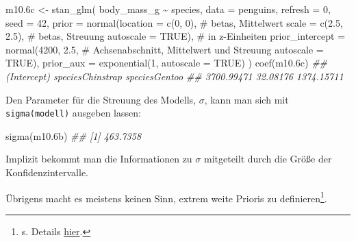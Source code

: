 \documentclass[
  a4paper,
  DIV=11]{scrreprt}
\newenvironment{Shaded}{\begin{snugshade}}{\end{snugshade}}
\newcommand{\AttributeTok}[1]{\textcolor[rgb]{0.40,0.45,0.13}{#1}}
\newcommand{\CommentTok}[1]{\textcolor[rgb]{0.37,0.37,0.37}{#1}}
\newcommand{\ConstantTok}[1]{\textcolor[rgb]{0.56,0.35,0.01}{#1}}
\newcommand{\DecValTok}[1]{\textcolor[rgb]{0.68,0.00,0.00}{#1}}
\newcommand{\DocumentationTok}[1]{\textcolor[rgb]{0.37,0.37,0.37}{\textit{#1}}}
\newcommand{\FloatTok}[1]{\textcolor[rgb]{0.68,0.00,0.00}{#1}}
\newcommand{\FunctionTok}[1]{\textcolor[rgb]{0.28,0.35,0.67}{#1}}
\newcommand{\NormalTok}[1]{\textcolor[rgb]{0.00,0.23,0.31}{#1}}
\newcommand{\OtherTok}[1]{\textcolor[rgb]{0.00,0.23,0.31}{#1}}
\newcommand{\SpecialCharTok}[1]{\textcolor[rgb]{0.37,0.37,0.37}{#1}}
\theoremstyle{definition}
\theoremstyle{remark}
\begin{document}
\begin{Shaded}
\begin{Highlighting}[]
\NormalTok{m10}\FloatTok{.6}\NormalTok{c }\OtherTok{\textless{}{-}} \FunctionTok{stan\_glm}\NormalTok{(}
\NormalTok{  body\_mass\_g }\SpecialCharTok{\textasciitilde{}}\NormalTok{ species, }
  \AttributeTok{data =}\NormalTok{ penguins, }
  \AttributeTok{refresh =} \DecValTok{0}\NormalTok{,}
  \AttributeTok{seed =} \DecValTok{42}\NormalTok{,}
  \AttributeTok{prior =} \FunctionTok{normal}\NormalTok{(}\AttributeTok{location =} \FunctionTok{c}\NormalTok{(}\DecValTok{0}\NormalTok{, }\DecValTok{0}\NormalTok{),  }\CommentTok{\# betas, Mittelwert}
                 \AttributeTok{scale =} \FunctionTok{c}\NormalTok{(}\FloatTok{2.5}\NormalTok{, }\FloatTok{2.5}\NormalTok{),  }\CommentTok{\# betas, Streuung}
                 \AttributeTok{autoscale =} \ConstantTok{TRUE}\NormalTok{),  }\CommentTok{\# in z{-}Einheiten}
  \AttributeTok{prior\_intercept =} \FunctionTok{normal}\NormalTok{(}\DecValTok{4200}\NormalTok{, }\FloatTok{2.5}\NormalTok{,   }\CommentTok{\# Achsenabschnitt, Mittelwert und Streuung}
                           \AttributeTok{autoscale =} \ConstantTok{TRUE}\NormalTok{), }
  \AttributeTok{prior\_aux =} \FunctionTok{exponential}\NormalTok{(}\DecValTok{1}\NormalTok{, }\AttributeTok{autoscale =} \ConstantTok{TRUE}\NormalTok{)}
\NormalTok{)}
\FunctionTok{coef}\NormalTok{(m10}\FloatTok{.6}\NormalTok{c)}
\DocumentationTok{\#\#      (Intercept) speciesChinstrap    speciesGentoo }
\DocumentationTok{\#\#       3700.99471         32.08176       1374.15711}
\end{Highlighting}
\end{Shaded}

Den Parameter für die Streuung des Modells, \(\sigma\), kann man sich
mit \texttt{sigma(modell)} ausgeben lassen:

\begin{Shaded}
\begin{Highlighting}[]
\FunctionTok{sigma}\NormalTok{(m10}\FloatTok{.6}\NormalTok{b)}
\DocumentationTok{\#\# [1] 463.7358}
\end{Highlighting}
\end{Shaded}

Implizit bekommt man die Informationen zu \(\sigma\) mitgeteilt durch
die Größe der Konfidenzintervalle.

Übrigens macht es meistens keinen Sinn, extrem weite Prioris zu
definieren\footnote{s. Details
  \href{https://mc-stan.org/rstanarm/articles/priors.html\#how-to-specify-flat-priors-and-why-you-typically-shouldnt}{hier}.}.
\end{document}
